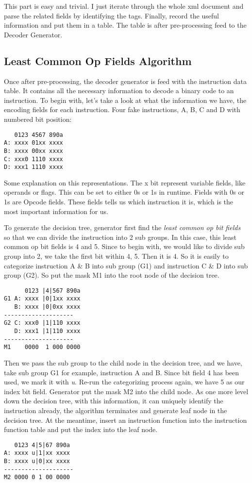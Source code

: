\documentclass[]{article}
\begin{document}
This part is easy and trivial. I just iterate through the whole xml document and parse the related fields by identifying the tags. Finally, record the useful information and put them in a table. The table is after pre-processing feed to the Decoder Generator.


\subsection{Least Common Op Fields Algorithm}
Once after pre-processing, the decoder generator is feed with the instruction data table. It contains all the necessary information
to decode a binary code to an instruction. To begin with, let's take a look at what the information we have, the encoding fields for 
each instruction. Four fake instructions, A, B, C and D with numbered bit position:

\begin{lstlisting}
   0123 4567 890a
A: xxxx 01xx xxxx
B: xxxx 00xx xxxx
C: xxx0 1110 xxxx
D: xxx1 1110 xxxx
\end{lstlisting}

Some explanation on this representations. The x bit represent variable fields, like operands or flags. This can be set to either 0s or
1s in runtime. Fields with 0s or 1s are Opcode fields. These fields tells us which instruction it is, which is the most important
information for us.

To generate the decision tree, generator first find the \textit{least common op bit fields} so that we can divide the instruction into
2 sub groups. In this case, this least common op bit fields is 4 and 5. Since to begin with, we would like to divide sub group into 2,
we take the first bit within 4, 5. Then it is 4. So it is easily to categorize instruction A \& B into sub group (G1) and instruction 
C \& D into sub group (G2). So put the mask M1 into the root node of the decision tree.

\begin{lstlisting}
      0123 |4|567 890a
G1 A: xxxx |0|1xx xxxx
   B: xxxx |0|0xx xxxx
--------------------
G2 C: xxx0 |1|110 xxxx
   D: xxx1 |1|110 xxxx
--------------------
M1    0000  1 000 0000
\end{lstlisting}

Then we pass the sub group to the child node in the decision tree, and we have, take sub group G1 for example, instruction A and B.
Since bit field 4 has been used, we mark it with \textit{u}. Re-run the categorizing process again, we have 5 as our index bit field.
Generator put the mask M2 into the child node. As one more level down the decision tree, with this information, it can uniquely identify the instruction already, the algorithm terminates and generate leaf node in the decision tree. At the meantime, insert an instruction function into the instruction function table and put the index into the leaf node.
\begin{lstlisting}
   0123 4|5|67 890a
A: xxxx u|1|xx xxxx
B: xxxx u|0|xx xxxx
--------------------
M2 0000 0 1 00 0000
\end{lstlisting}
\end{document}
